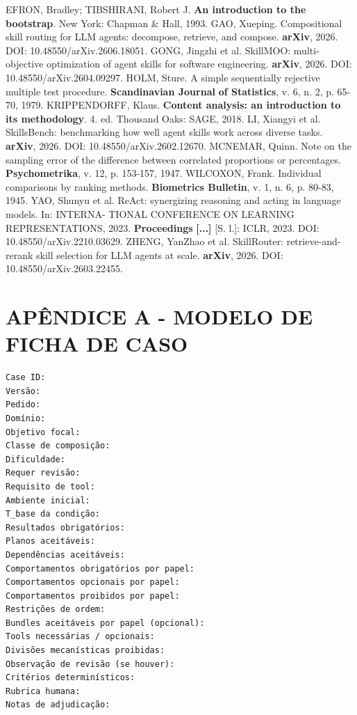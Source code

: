 \documentclass[12pt,a4paper]{article}
\begin{document}
EFRON, Bradley; TIBSHIRANI, Robert J.\textbf{ An introduction to the bootstrap}. New York: Chapman \& Hall, 1993. GAO, Xueping. Compositional skill routing for LLM agents: decompose, retrieve, and compose. \textbf{arXiv}, 2026. DOI: 10.48550/arXiv.2606.18051. GONG, Jingzhi et al. SkillMOO: multi-objective optimization of agent skills for software engineering.\textbf{ arXiv}, 2026. DOI: 10.48550/arXiv.2604.09297. HOLM, Sture. A simple sequentially rejective multiple test procedure.\textbf{ Scandinavian Journal} \textbf{of Statistics}, v. 6, n. 2, p. 65-70, 1979. KRIPPENDORFF, Klaus.\textbf{ Content analysis: an introduction to its methodology}. 4. ed. Thousand Oaks: SAGE, 2018. LI, Xiangyi et al. SkillsBench: benchmarking how well agent skills work across diverse tasks. \textbf{arXiv}, 2026. DOI: 10.48550/arXiv.2602.12670. MCNEMAR, Quinn. Note on the sampling error of the difference between correlated proportions or percentages.\textbf{ Psychometrika}, v. 12, p. 153-157, 1947. WILCOXON, Frank. Individual comparisons by ranking methods.\textbf{ Biometrics Bulletin}, v. 1, n. 6, p. 80-83, 1945. YAO, Shunyu et al. ReAct: synergizing reasoning and acting in language models. In: INTERNA- TIONAL CONFERENCE ON LEARNING REPRESENTATIONS, 2023.\textbf{ Proceedings} \textbf{[...]} [S. l.]: ICLR, 2023. DOI: 10.48550/arXiv.2210.03629. ZHENG, YanZhao et al. SkillRouter: retrieve-and-rerank skill selection for LLM agents at scale. \textbf{arXiv}, 2026. DOI: 10.48550/arXiv.2603.22455.



\section*{APÊNDICE A - MODELO DE FICHA DE CASO}

\begin{Verbatim}[breaklines=true,breakanywhere=true,fontsize=\small]
Case ID:
Versão:
Pedido:
Domínio:
Objetivo focal:
Classe de composição:
Dificuldade:
Requer revisão:
Requisito de tool:
Ambiente inicial:
T_base da condição:
Resultados obrigatórios:
Planos aceitáveis:
Dependências aceitáveis:
Comportamentos obrigatórios por papel:
Comportamentos opcionais por papel:
Comportamentos proibidos por papel:
Restrições de ordem:
Bundles aceitáveis por papel (opcional):
Tools necessárias / opcionais:
Divisões mecanísticas proibidas:
Observação de revisão (se houver):
Critérios determinísticos:
Rubrica humana:
Notas de adjudicação:
\end{Verbatim}
\end{document}
